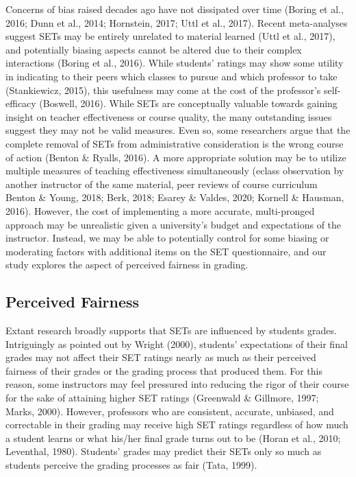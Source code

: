 \documentclass[
  man,mask]{apa7}
\begin{document}
Concerns of bias raised decades ago have not dissipated over time (Boring et al., 2016; Dunn et al., 2014; Hornstein, 2017; Uttl et al., 2017). Recent meta-analyses suggest SETs may be
entirely unrelated to material learned (Uttl et al., 2017), and potentially
biasing aspects cannot be altered due to their complex interactions
(Boring et al., 2016). While students' ratings may show some utility in
indicating to their peers which classes to pursue and which professor to
take (Stankiewicz, 2015), this usefulness may come at the cost of the professor's
self-efficacy (Boswell, 2016). While SETs are conceptually valuable
towards gaining insight on teacher effectiveness or course quality, the
many outstanding issues suggest they may not be valid measures. Even so,
some researchers argue that the complete removal of SETs from
administrative consideration is the wrong course of action
(Benton \& Ryalls, 2016). A more appropriate solution may be to utilize multiple
measures of teaching effectiveness simultaneously (eclass observation by
another instructor of the same material, peer reviews of course curriculum Benton \& Young, 2018; Berk, 2018; Esarey \& Valdes, 2020; Kornell \& Hausman, 2016). However, the cost of implementing
a more accurate, multi-pronged approach may be unrealistic given a
university's budget and expectations of the instructor. Instead, we may be able to potentially control for some biasing or moderating factors with additional items on the SET questionnaire, and our study explores the aspect of perceived fairness in grading.

\subsection{Perceived Fairness}\label{perceived-fairness}

Extant research broadly supports that SETs are influenced by students grades. Intriguingly as pointed out by Wright (2000), students' expectations of their final grades may not affect their SET ratings nearly as much as their perceived fairness of their grades or the grading process that produced them. For this reason, some instructors may feel pressured into reducing the rigor of their course for the sake of attaining higher SET ratings (Greenwald \& Gillmore, 1997; Marks, 2000). However, professors who are consistent, accurate, unbiased, and correctable in their grading may receive high SET ratings regardless of how much a student learns or what his/her final grade turns out to be (Horan et al., 2010; Leventhal, 1980). Students' grades may predict their SETs only so much as students perceive the grading processes as fair (Tata, 1999).
\end{document}
